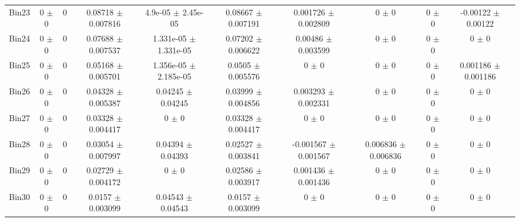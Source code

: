 \begin{tabular}{@{\extracolsep{4pt}}lccccccccc@{}}
     Bin23 & 0 $\pm$ 0 & 0 & 0.08718 $\pm$ 0.007816 & 4.9e-05 $\pm$ 2.45e-05 & 0.08667 $\pm$ 0.007191 & 0.001726 $\pm$ 0.002809 & 0 $\pm$ 0 & 0 $\pm$ 0 & -0.00122 $\pm$ 0.00122 \\ 
     Bin24 & 0 $\pm$ 0 & 0 & 0.07688 $\pm$ 0.007537 & 1.331e-05 $\pm$ 1.331e-05 & 0.07202 $\pm$ 0.006622 & 0.00486 $\pm$ 0.003599 & 0 $\pm$ 0 & 0 $\pm$ 0 & 0 $\pm$ 0 \\ 
     Bin25 & 0 $\pm$ 0 & 0 & 0.05168 $\pm$ 0.005701 & 1.356e-05 $\pm$ 2.185e-05 & 0.0505 $\pm$ 0.005576 & 0 $\pm$ 0 & 0 $\pm$ 0 & 0 $\pm$ 0 & 0.001186 $\pm$ 0.001186 \\ 
     Bin26 & 0 $\pm$ 0 & 0 & 0.04328 $\pm$ 0.005387 & 0.04245 $\pm$ 0.04245 & 0.03999 $\pm$ 0.004856 & 0.003293 $\pm$ 0.002331 & 0 $\pm$ 0 & 0 $\pm$ 0 & 0 $\pm$ 0 \\ 
     Bin27 & 0 $\pm$ 0 & 0 & 0.03328 $\pm$ 0.004417 & 0 $\pm$ 0 & 0.03328 $\pm$ 0.004417 & 0 $\pm$ 0 & 0 $\pm$ 0 & 0 $\pm$ 0 & 0 $\pm$ 0 \\ 
     Bin28 & 0 $\pm$ 0 & 0 & 0.03054 $\pm$ 0.007997 & 0.04394 $\pm$ 0.04393 & 0.02527 $\pm$ 0.003841 & -0.001567 $\pm$ 0.001567 & 0.006836 $\pm$ 0.006836 & 0 $\pm$ 0 & 0 $\pm$ 0 \\ 
     Bin29 & 0 $\pm$ 0 & 0 & 0.02729 $\pm$ 0.004172 & 0 $\pm$ 0 & 0.02586 $\pm$ 0.003917 & 0.001436 $\pm$ 0.001436 & 0 $\pm$ 0 & 0 $\pm$ 0 & 0 $\pm$ 0 \\ 
     Bin30 & 0 $\pm$ 0 & 0 & 0.0157 $\pm$ 0.003099 & 0.04543 $\pm$ 0.04543 & 0.0157 $\pm$ 0.003099 & 0 $\pm$ 0 & 0 $\pm$ 0 & 0 $\pm$ 0 & 0 $\pm$ 0 \\ 
\hline\hline
  \end{tabular}
